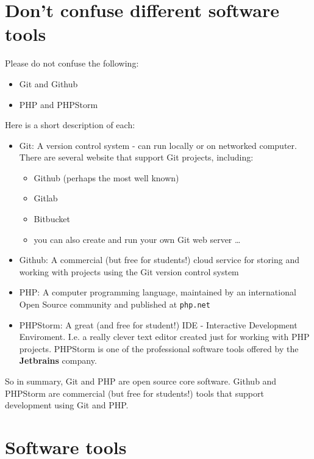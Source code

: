 \documentclass[a4paperpaper,openright]{book}
\providecommand{\tightlist}{%
  \setlength{\itemsep}{0pt}\setlength{\parskip}{0pt}}
\begin{document}
\hypertarget{dont-confuse-different-software-tools}{%
\section{Don't confuse different software
tools}\label{dont-confuse-different-software-tools}}

Please do not confuse the following:

\begin{itemize}
\tightlist
\item
  Git and Github
\item
  PHP and PHPStorm
\end{itemize}

Here is a short description of each:

\begin{itemize}
\item
  Git: A version control system - can run locally or on networked
  computer. There are several website that support Git projects,
  including:

  \begin{itemize}
  \tightlist
  \item
    Github (perhaps the most well known)
  \item
    Gitlab
  \item
    Bitbucket
  \item
    you can also create and run your own Git web server \ldots{}
  \end{itemize}
\item
  Github: A commercial (but free for students!) cloud service for
  storing and working with projects using the Git version control system
\item
  PHP: A computer programming language, maintained by an international
  Open Source community and published at \texttt{php.net}
\item
  PHPStorm: A great (and free for student!) IDE - Interactive
  Development Enviroment. I.e. a really clever text editor created just
  for working with PHP projects. PHPStorm is one of the professional
  software tools offered by the \textbf{Jetbrains} company.
\end{itemize}

So in summary, Git and PHP are open source core software. Github and
PHPStorm are commercial (but free for students!) tools that support
development using Git and PHP.

\hypertarget{software-tools}{%
\section{Software tools}\label{software-tools}}
\end{document}
